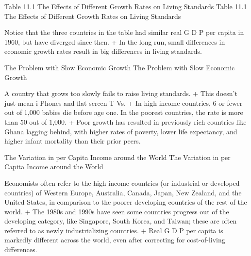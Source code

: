 \documentclass[
  12pt,
  ignorenonframetext,
]{beamer}
\begin{document}
\begin{frame}{Table 11.1 The Effects of Different Growth Rates on Living
Standards}
\protect\hypertarget{table-11.1-the-effects-of-different-growth-rates-on-living-standards}{}
Table 11.1 The Effects of Different Growth Rates on Living Standards

Notice that the three countries in the table had similar real G D P per
capita in 1960, but have diverged since then. + In the long run, small
differences in economic growth rates result in big differences in living
standards.
\end{frame}

\begin{frame}{The Problem with Slow Economic Growth}
\protect\hypertarget{the-problem-with-slow-economic-growth}{}
The Problem with Slow Economic Growth

A country that grows too slowly fails to raise living standards. + This
doesn't just mean i Phones and flat-screen T Vs. + In high-income
countries, 6 or fewer out of 1,000 babies die before age one. In the
poorest countries, the rate is more than 50 out of 1,000. + Poor growth
has resulted in previously rich countries like Ghana lagging behind,
with higher rates of poverty, lower life expectancy, and higher infant
mortality than their prior peers.
\end{frame}

\begin{frame}{The Variation in per Capita Income around the World}
\protect\hypertarget{the-variation-in-per-capita-income-around-the-world}{}
The Variation in per Capita Income around the World

Economists often refer to the high-income countries (or industrial or
developed countries) of Western Europe, Australia, Canada, Japan, New
Zealand, and the United States, in comparison to the poorer developing
countries of the rest of the world. + The 1980s and 1990s have seen some
countries progress out of the developing category, like Singapore, South
Korea, and Taiwan; these are often referred to as newly industrializing
countries. + Real G D P per capita is markedly different across the
world, even after correcting for cost-of-living differences.
\end{frame}
\end{document}

